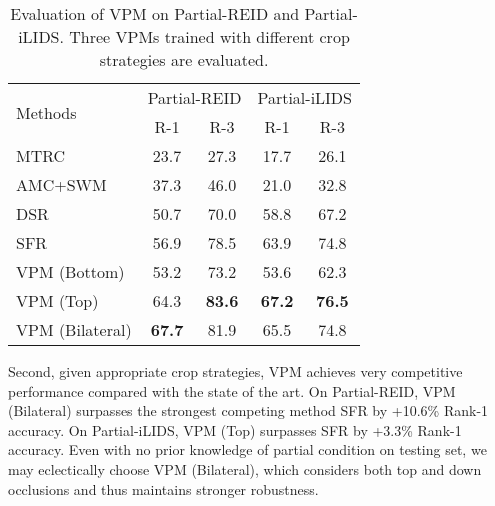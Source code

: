 \documentclass[10pt,twocolumn,letterpaper]{article}
\begin{document}
\setlength{\tabcolsep}{4.2pt}
\begin{table}[t]
\begin{center}
\begin{tabular}{l|cc|cc}
\hline
\multicolumn{1}{l|}{\multirow{2}{*}{Methods}}&\multicolumn{2}{c|}{Partial-REID}&\multicolumn{2}{c}{Partial-iLIDS}\\
\cline{2-5}
\multicolumn{1}{c|}{}&R-1&R-3&R-1&R-3\\
\hline
MTRC \cite{DBLP:journals/pami/LiaoJL13}                   &23.7 &27.3  &17.7&26.1\\
AMC+SWM \cite{DBLP:conf/iccv/ZhengLXLLG15}            &37.3 &46.0   &21.0&32.8\\
DSR \cite{HeLX2018Partial}                       &50.7 &70.0  &58.8  &67.2\\
SFR \cite{DBLP:journals/corr/abs-1810-07399}                        &56.9 & 78.5  &63.9 &74.8\\
\hline
VPM (Bottom)          &53.2 & 73.2  & 53.6  &  62.3\\      
VPM (Top)             &64.3 & \textbf{83.6}  &\textbf{67.2}  & \textbf{76.5}\\
VPM (Bilateral)      &\textbf{67.7}  &{81.9}  &65.5 &74.8  \\

\hline
\end{tabular}
\caption{Evaluation of VPM on Partial-REID and Partial-iLIDS. Three VPMs trained with different crop strategies are evaluated.}
\label{tab:sota}
\end{center}
\setlength{\abovecaptionskip}{0cm} 
\setlength{\belowcaptionskip}{0pt} 
\end{table}
Second, given appropriate crop strategies, VPM achieves very competitive performance compared with the state of the art. On Partial-REID, VPM (Bilateral) surpasses the strongest competing method SFR by +10.6\% Rank-1 accuracy. On Partial-iLIDS, VPM (Top) surpasses SFR by +3.3\% Rank-1 accuracy. Even with no prior knowledge of partial condition on testing set, we may eclectically choose VPM (Bilateral), which considers both top and down occlusions and thus maintains stronger robustness. 
\end{document}
